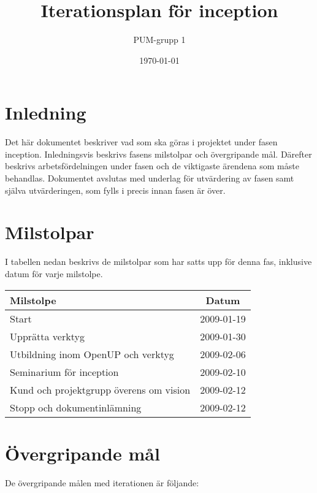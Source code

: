 

\ifpdf
\else
\fi

\title{Iterationsplan för inception}
\author{PUM-grupp 1}
\date{\today}



\maketitle\thispagestyle{empty}
\newpage

\section{Inledning}
Det här dokumentet beskriver vad som ska göras i projektet under fasen inception. Inledningsvis beskrivs fasens milstolpar och övergripande mål. Därefter beskrivs arbetsfördelningen under fasen och de viktigaste ärendena som måste behandlas. Dokumentet avslutas med underlag för utvärdering av fasen samt själva utvärderingen, som fylls i precis innan fasen är över.

\section{Milstolpar}
I tabellen nedan beskrivs de milstolpar som har satts upp för denna fas, inklusive datum för varje milstolpe.

\begin{center}
	\begin{tabular}{| l | c |}
	\hline \textbf{Milstolpe} & \textbf{Datum} \\
	\hline Start & 2009-01-19 \\
	\hline Upprätta verktyg & 2009-01-30 \\
	\hline Utbildning inom OpenUP och verktyg & 2009-02-06 \\
	\hline Seminarium för inception & 2009-02-10 \\
	\hline Kund och projektgrupp överens om vision & 2009-02-12 \\
	\hline Stopp och dokumentinlämning & 2009-02-12 \\
	\hline
	\end{tabular}
\end{center}

\section{Övergripande mål}
De övergripande målen med iterationen är följande:


